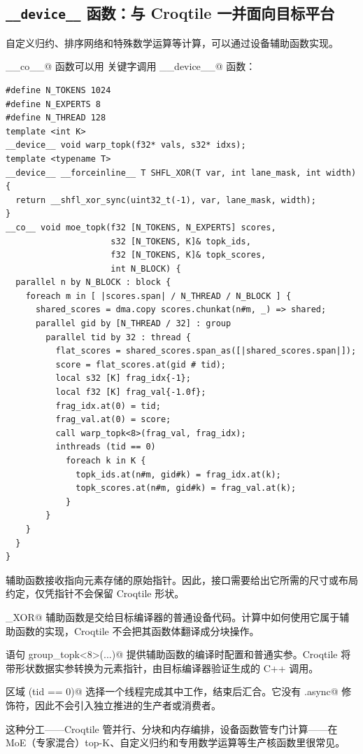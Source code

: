 \subsection*{\texttt{\_\_device\_\_} 函数：与 Croqtile 一并面向目标平台}

自定义归约、排序网络和特殊数学运算等计算，可以通过设备辅助函数实现。

\co@__co__@ 函数可以用 \co@call@ 关键字调用 \co@__device__@ 函数：

\begin{lstlisting}[language=croqtile,caption={device 函数：与 Croqtile 一并面向目标平台}]
#define N_TOKENS 1024
#define N_EXPERTS 8
#define N_THREAD 128
template <int K>
__device__ void warp_topk(f32* vals, s32* idxs);
template <typename T>
__device__ __forceinline__ T SHFL_XOR(T var, int lane_mask, int width) {
  return __shfl_xor_sync(uint32_t(-1), var, lane_mask, width);
}
__co__ void moe_topk(f32 [N_TOKENS, N_EXPERTS] scores,
                     s32 [N_TOKENS, K]& topk_ids,
                     f32 [N_TOKENS, K]& topk_scores,
                     int N_BLOCK) {
  parallel n by N_BLOCK : block {
    foreach m in [ |scores.span| / N_THREAD / N_BLOCK ] {
      shared_scores = dma.copy scores.chunkat(n#m, _) => shared;
      parallel gid by [N_THREAD / 32] : group
        parallel tid by 32 : thread {
          flat_scores = shared_scores.span_as([|shared_scores.span|]);
          score = flat_scores.at(gid # tid);
          local s32 [K] frag_idx{-1};
          local f32 [K] frag_val{-1.0f};
          frag_idx.at(0) = tid;
          frag_val.at(0) = score;
          call warp_topk<8>(frag_val, frag_idx);
          inthreads (tid == 0)
            foreach k in K {
              topk_ids.at(n#m, gid#k) = frag_idx.at(k);
              topk_scores.at(n#m, gid#k) = frag_val.at(k);
            }
        }
    }
  }
}
\end{lstlisting}

辅助函数接收指向元素存储的原始指针。因此，接口需要给出它所需的尺寸或布局约定，仅凭指针不会保留 Croqtile 形状。

\co@SHFL_XOR@ 辅助函数是交给目标编译器的普通设备代码。计算中如何使用它属于辅助函数的实现，Croqtile 不会把其函数体翻译成分块操作。

语句 \co@call group_topk<8>(...)@ 提供辅助函数的编译时配置和普通实参。Croqtile 将带形状数据实参转换为元素指针，由目标编译器验证生成的 C++ 调用。

区域 \co@inthreads (tid == 0)@ 选择一个线程完成其中工作，结束后汇合。它没有 \co@.async@ 修饰符，因此不会引入独立推进的生产者或消费者。

这种分工——Croqtile 管并行、分块和内存编排，设备函数管专门计算——在 MoE（专家混合）top-K、自定义归约和专用数学运算等生产核函数里很常见。
